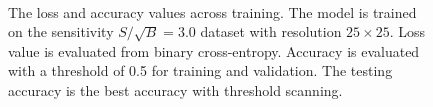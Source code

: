 \documentclass[12pt]{article}
\begin{document}
			\begin{figure}[htpb]
				\centering
				 \\ 
				\caption{The loss and accuracy values across training. The model is trained on the sensitivity $S / \sqrt{B} = 3.0$ dataset with resolution $25\times 25$. Loss value is evaluated from binary cross-entropy. Accuracy is evaluated with a threshold of 0.5 for training and validation. The testing accuracy is the best accuracy with threshold scanning.}
				\label{fig:loss_acc_across_training_SB_3_res_25}
			\end{figure}
\end{document}
